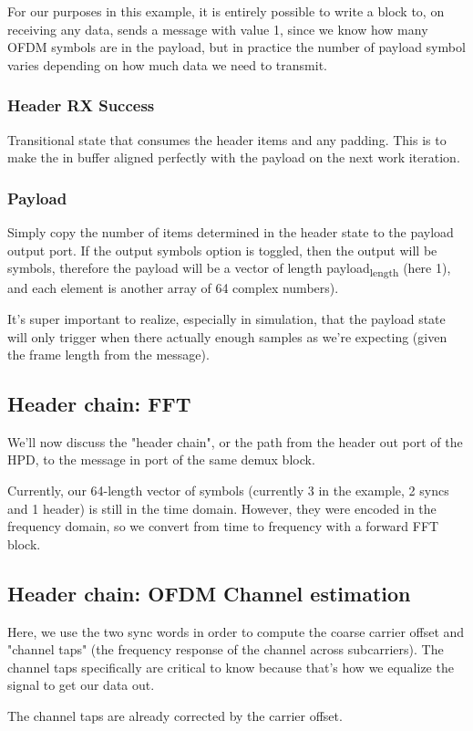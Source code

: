 \documentclass[11pt]{article}
\begin{document}
For our purposes in this example, it is entirely possible to write a
block to, on receiving any data, sends a message with value 1, since
we know how many OFDM symbols are in the payload, but in practice the
number of payload symbol varies depending on how much data we need to
transmit.
\subsubsection{Header RX Success}
\label{sec:orge1da158}
Transitional state that consumes the header items and any
padding. This is to make the in buffer aligned perfectly with the
payload on the next work iteration.
\subsubsection{Payload}
\label{sec:org7689969}
Simply copy the number of items determined in the header state to the
payload output port. If the output symbols option is toggled, then the
output will be symbols, therefore the payload will be a vector of
length payload\textsubscript{length} (here 1), and each element is another array of
64 complex numbers).

It's super important to realize, especially in simulation, that the
payload state will only trigger when there actually enough samples as
we're expecting (given the frame length from the message).
\subsection{Header chain: FFT}
\label{sec:org7a10169}
We'll now discuss the "header chain", or the path from the header out port
of the HPD, to the message in port of the same demux block.

Currently, our 64-length vector of symbols (currently 3 in the
example, 2 syncs and 1 header) is still in the time domain. However,
they were encoded in the frequency domain, so we convert from time to
frequency with a forward FFT block.
\subsection{Header chain: OFDM Channel estimation}
\label{sec:org26cdce0}
Here, we use the two sync words in order to compute the coarse carrier
offset and "channel taps" (the frequency response of the channel
across subcarriers). The channel taps specifically are critical to
know because that's how we equalize the signal to get our data out.

The channel taps are already corrected by the carrier offset.
\end{document}
